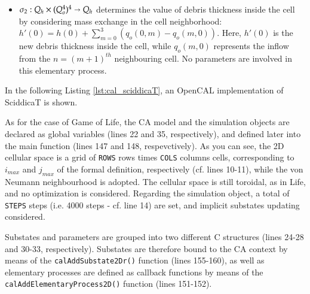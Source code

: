 \begin{itemize}
\begin{itemize}

\item $\sigma_2: Q_h \times (Q_o^4)^4 \shortrightarrow Q_h$ determines
  the value of debris thickness inside the cell by considering mass
  exchange in the cell neighborhood: $h'(0) = h(0) + \sum_{m=0}^3
  (q_o(0,m) - q_o(m,0))$. Here, $h'(0)$ is the new debris
  thickness inside the cell, while $q_o(m,0)$ represents the inflow from
  the $n=(m+1)^{th}$ neighbouring cell. No parameters are involved in
  this elementary process.

\end{itemize}
\end{itemize}

In the following Listing \ref{lst:cal_sciddicaT}, an OpenCAL
implementation of SciddicaT is shown.



As for the case of Game of Life, the CA model and the simulation
objects are declared as global variables (lines 22 and 35,
respectively), and defined later into the main function (lines 147 and
148, respevctively). As you can see, the 2D cellular space is a grid
of \verb'ROWS' rows times \verb'COLS' columns cells, corresponding to
$i_{max}$ and $j_{max}$ of the formal definition, respectively
(cf. lines 10-11), while the von Neumann neighbourhood is adopted. The
cellular space is still toroidal, as in Life, and no optimization is
considered. Regarding the simulation object, a total of \verb'STEPS'
steps (i.e. 4000 steps - cf. line 14) are set, and implicit substates
updating considered.

Substates and parameters are grouped into two different C structures
(lines 24-28 and 30-33, respectively). Substates are therefore bound to
the CA context by means of the \verb'calAddSubstate2Dr()' function
(lines 155-160), as well as elementary processes are defined as
callback functions by means of the \verb'calAddElementaryProcess2D()'
function (lines 151-152).

